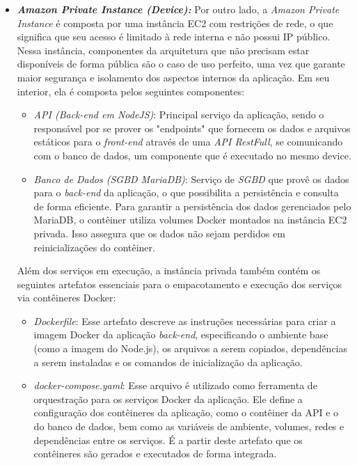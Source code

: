\begin{itemize}
  \item \textbf{\textit{Amazon Private Instance (Device):}} Por outro lado, a \textit{Amazon Private Instance} é composta por uma instância EC2 com restrições de rede, o que significa que seu acesso é limitado à rede interna e não possui IP público. Nessa instância, componentes da arquitetura que não precisam estar disponíveis de forma pública são o caso de uso perfeito, uma vez que garante maior segurança e isolamento dos aspectos internos da aplicação. Em seu interior, ela é composta pelos seguintes componentes:
    \begin{itemize}
      \item \textit{API (Back-end em NodeJS)}: Principal serviço da aplicação, sendo o responsável por se prover os "endpoints" que fornecem os dados e arquivos estáticos para o \textit{front-end} através de uma \textit{API RestFull}, se comunicando com o banco de dados, um componente que é executado no mesmo device.
      \item \textit{Banco de Dados (SGBD MariaDB)}: Serviço de \textit{SGBD} que provê os dados para o \textit{back-end} da aplicação, o que possibilita a persistência e consulta de forma eficiente. Para garantir a persistência dos dados gerenciados pelo MariaDB, o contêiner utiliza volumes Docker montados na instância EC2 privada. Isso assegura que os dados não sejam perdidos em reinicializações do contêiner.
    \end{itemize}
  Além dos serviços em execução, a instância privada também contém os seguintes artefatos essenciais para o empacotamento e execução dos serviços via contêineres Docker:
    \begin{itemize}
      \item \textit{Dockerfile}: Esse artefato descreve as instruções necessárias para criar a imagem Docker da aplicação \textit{back-end}, especificando o ambiente base (como a imagem do Node.js), os arquivos a serem copiados, dependências a serem instaladas e os comandos de inicialização da aplicação.

      \item \textit{docker-compose.yaml}: Esse arquivo é utilizado como ferramenta de orquestração para os serviços Docker da aplicação. Ele define a configuração dos contêineres da aplicação, como o contêiner da API e o do banco de dados, bem como as variáveis de ambiente, volumes, redes e dependências entre os serviços. É a partir deste artefato que os contêineres são gerados e executados de forma integrada.
    \end{itemize}


\end{itemize}
